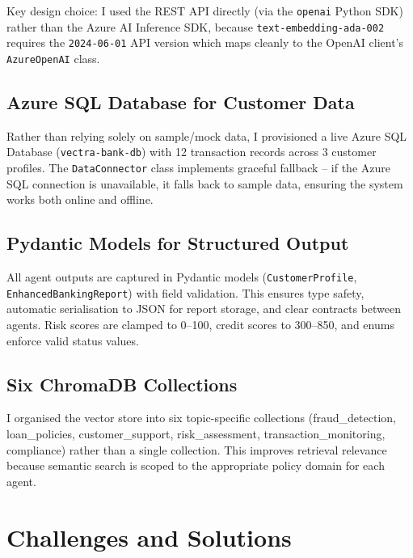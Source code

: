 \documentclass[12pt,a4paper]{article}
\begin{document}
Key design choice: I used the REST API directly (via the \texttt{openai} Python SDK)
rather than the Azure AI Inference SDK, because \texttt{text-embedding-ada-002}
requires the \texttt{2024-06-01} API version which maps cleanly to the OpenAI
client's \texttt{AzureOpenAI} class.

\subsection{Azure SQL Database for Customer Data}

Rather than relying solely on sample/mock data, I provisioned a live Azure
SQL Database (\texttt{vectra-bank-db}) with 12 transaction records across 3 customer
profiles. The \texttt{DataConnector} class implements graceful fallback -- if the
Azure SQL connection is unavailable, it falls back to sample data, ensuring
the system works both online and offline.

\subsection{Pydantic Models for Structured Output}

All agent outputs are captured in Pydantic models (\texttt{CustomerProfile},
\texttt{EnhancedBankingReport}) with field validation. This ensures type safety,
automatic serialisation to JSON for report storage, and clear contracts
between agents. Risk scores are clamped to 0--100, credit scores to 300--850,
and enums enforce valid status values.

\subsection{Six ChromaDB Collections}

I organised the vector store into six topic-specific collections
(fraud\_detection, loan\_policies, customer\_support, risk\_assessment,
transaction\_monitoring, compliance) rather than a single collection. This
improves retrieval relevance because semantic search is scoped to the
appropriate policy domain for each agent.

\section{Challenges and Solutions}
\end{document}
